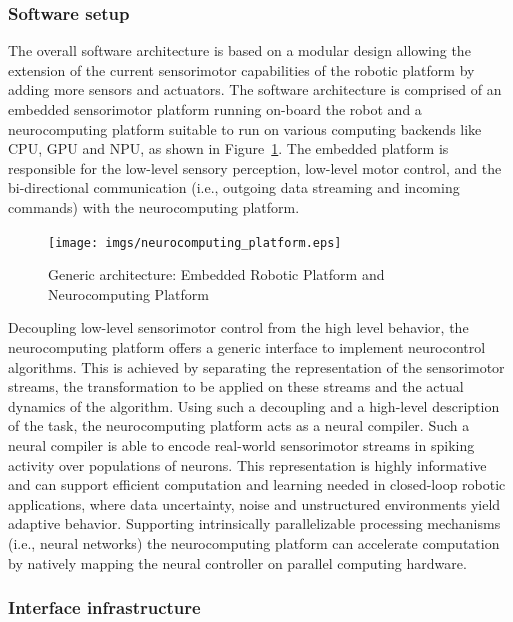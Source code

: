 \subsubsection{Software setup}%
\label{ssubsec:software_setup}

The overall software architecture is based on a modular design allowing the extension of the current sensorimotor capabilities of the robotic platform by adding more sensors and actuators. 
The software architecture is comprised of an embedded sensorimotor platform running on-board the robot and a neurocomputing platform suitable to run on various computing backends like \ac{CPU}, \ac{GPU} and \ac{NPU}, as shown in Figure~\ref{fig:neurocomputing_platform}. 
The embedded platform is responsible for the low-level sensory perception, low-level motor control, and the bi-directional communication (i.e., outgoing data streaming and incoming commands) with the neurocomputing platform. 
\begin{figure}[t]
    \centering
    \texttt{[image: imgs/neurocomputing\_platform.eps]}
    \caption{Generic architecture: Embedded Robotic Platform and Neurocomputing Platform}
    \label{fig:neurocomputing_platform}
\end{figure}
Decoupling low-level sensorimotor control from the high level behavior, the neurocomputing platform offers a generic interface to implement neurocontrol algorithms. 
This is achieved by separating the representation of the sensorimotor streams, the transformation to be applied on these streams and the actual dynamics of the algorithm. 
Using such a decoupling and a high-level description of the task, the neurocomputing platform acts as a neural compiler. 
Such a neural compiler is able to encode real-world sensorimotor streams in spiking activity over populations of neurons. 
This representation is highly informative and can support efficient computation and learning needed in closed-loop robotic applications, where data uncertainty, noise and unstructured environments yield adaptive behavior. 
Supporting intrinsically parallelizable processing mechanisms (i.e., neural networks) the neurocomputing platform can accelerate computation by natively mapping the neural controller on parallel computing hardware.

\subsubsection{Interface infrastructure}%
\label{ssubsec:interface_infrastructure}

